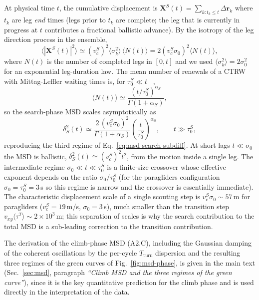 \documentclass[11pt,a4paper]{article}
\begin{document}
At physical time $t$, the cumulative displacement is $\mathbf{X}^S(t)
= \sum_{k : t_k \le t} \Delta\mathbf{r}_k$ where $t_k$ are leg
\emph{end} times (legs prior to $t_k$ are complete; the leg that
is currently in progress at $t$ contributes a fractional ballistic
advance). By the isotropy of the leg direction process in the
ensemble,
\begin{equation}
\langle |\mathbf{X}^S(t)|^2\rangle
\simeq (v_c^S)^2 \langle \sigma_k^2\rangle\,\langle N(t)\rangle
= 2 (v_c^S \sigma_0)^2 \langle N(t)\rangle,
\end{equation}
where $N(t)$ is the number of completed legs in $[0, t]$ and we
used $\langle\sigma_k^2\rangle = 2\sigma_0^2$ for an exponential
leg-duration law. The mean number of renewals of a CTRW with
Mittag-Leffler waiting times is, for $\tau_0^S \ll t$
~\cite{metzler2000,scalas2004},
\begin{equation}
\langle N(t)\rangle \simeq
\frac{(t/\tau_0^S)^{\alpha_S}}{\Gamma(1+\alpha_S)},
\end{equation}
so the search-phase MSD scales asymptotically as
\begin{equation}
\delta^2_S(t) \simeq
\frac{2\,(v_c^S \sigma_0)^2}{\Gamma(1+\alpha_S)}
\left(\frac{t}{\tau_0^S}\right)^{\alpha_S},
\qquad t \gg \tau_0^S,
\label{eq:app-search-asymp}
\end{equation}
reproducing the third regime of Eq.~\eqref{eq:msd-search-subdiff}.
At short lags $t \ll \sigma_0$ the MSD is ballistic,
$\delta^2_S(t) \simeq (v_c^S)^2 t^2$, from the motion inside a
single leg. The intermediate regime $\sigma_0 \ll t \ll \tau_0^S$
is a finite-size crossover whose effective exponent depends on the
ratio $\sigma_0/\tau_0^S$ (for the paragliders configuration
$\sigma_0 = \tau_0^S = 3$\,s so this regime is narrow and the
crossover is essentially immediate). The characteristic
displacement scale of a single scouting step is
$v_c^S \sigma_0 \sim 57$\,m for paragliders ($v_c^S=19$\,m/s,
$\sigma_0=3$\,s), much smaller than the transition step
$v_{xy}\langle\tau^T\rangle \sim 2\times 10^3$\,m; this separation
of scales is why the search contribution to the total MSD is a
sub-leading correction to the transition contribution.

The derivation of the climb-phase MSD (A2.C), including the
Gaussian damping of the coherent oscillations by the per-cycle
$T_{\mathrm{turn}}$ dispersion and the resulting three regimes of
the green curves of Fig.~\ref{fig:msd-phase}, is given in the main
text (Sec.~\ref{sec:msd}, paragraph \emph{``Climb MSD and the three
regimes of the green curve''}), since it is the key quantitative
prediction for the climb phase and is used directly in the
interpretation of the data.
\end{document}
